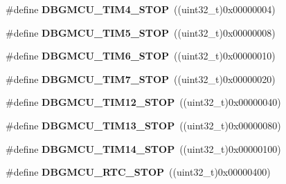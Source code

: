 \begin{DoxyCompactItemize}
\item 
\hypertarget{group___d_b_g_m_c_u___exported___constants_gac87363a4018e2b23a907cfaf836494f1}{\#define {\bfseries D\-B\-G\-M\-C\-U\-\_\-\-T\-I\-M4\-\_\-\-S\-T\-O\-P}~((uint32\-\_\-t)0x00000004)}\label{group___d_b_g_m_c_u___exported___constants_gac87363a4018e2b23a907cfaf836494f1}

\item 
\hypertarget{group___d_b_g_m_c_u___exported___constants_gaf97e21534b3aa9482af496497a37ff4b}{\#define {\bfseries D\-B\-G\-M\-C\-U\-\_\-\-T\-I\-M5\-\_\-\-S\-T\-O\-P}~((uint32\-\_\-t)0x00000008)}\label{group___d_b_g_m_c_u___exported___constants_gaf97e21534b3aa9482af496497a37ff4b}

\item 
\hypertarget{group___d_b_g_m_c_u___exported___constants_ga076cf7d18c7019e99f5f15962ab317eb}{\#define {\bfseries D\-B\-G\-M\-C\-U\-\_\-\-T\-I\-M6\-\_\-\-S\-T\-O\-P}~((uint32\-\_\-t)0x00000010)}\label{group___d_b_g_m_c_u___exported___constants_ga076cf7d18c7019e99f5f15962ab317eb}

\item 
\hypertarget{group___d_b_g_m_c_u___exported___constants_gaf593ca16ee6d3f1fabc549878f3f87f0}{\#define {\bfseries D\-B\-G\-M\-C\-U\-\_\-\-T\-I\-M7\-\_\-\-S\-T\-O\-P}~((uint32\-\_\-t)0x00000020)}\label{group___d_b_g_m_c_u___exported___constants_gaf593ca16ee6d3f1fabc549878f3f87f0}

\item 
\hypertarget{group___d_b_g_m_c_u___exported___constants_ga4814287cef24f57e795b0f5b0174b49c}{\#define {\bfseries D\-B\-G\-M\-C\-U\-\_\-\-T\-I\-M12\-\_\-\-S\-T\-O\-P}~((uint32\-\_\-t)0x00000040)}\label{group___d_b_g_m_c_u___exported___constants_ga4814287cef24f57e795b0f5b0174b49c}

\item 
\hypertarget{group___d_b_g_m_c_u___exported___constants_gae0dd8a28977b261b013fa1ecda79b289}{\#define {\bfseries D\-B\-G\-M\-C\-U\-\_\-\-T\-I\-M13\-\_\-\-S\-T\-O\-P}~((uint32\-\_\-t)0x00000080)}\label{group___d_b_g_m_c_u___exported___constants_gae0dd8a28977b261b013fa1ecda79b289}

\item 
\hypertarget{group___d_b_g_m_c_u___exported___constants_ga731f63d66045abee68dbc634070df051}{\#define {\bfseries D\-B\-G\-M\-C\-U\-\_\-\-T\-I\-M14\-\_\-\-S\-T\-O\-P}~((uint32\-\_\-t)0x00000100)}\label{group___d_b_g_m_c_u___exported___constants_ga731f63d66045abee68dbc634070df051}

\item 
\hypertarget{group___d_b_g_m_c_u___exported___constants_gaa0da3d959bc74550ea6a02534768074f}{\#define {\bfseries D\-B\-G\-M\-C\-U\-\_\-\-R\-T\-C\-\_\-\-S\-T\-O\-P}~((uint32\-\_\-t)0x00000400)}\label{group___d_b_g_m_c_u___exported___constants_gaa0da3d959bc74550ea6a02534768074f}


\end{DoxyCompactItemize}
